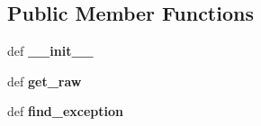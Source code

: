 \subsection*{Public Member Functions}
\begin{DoxyCompactItemize}
\item 
\hypertarget{classcheshire3_1_1document_1_1_string_document_a63fc40df6bebc5f8257cdc7d507d21c4}{def {\bfseries \-\_\-\-\_\-init\-\_\-\-\_\-}}\label{classcheshire3_1_1document_1_1_string_document_a63fc40df6bebc5f8257cdc7d507d21c4}

\item 
\hypertarget{classcheshire3_1_1document_1_1_string_document_a969220bbf5f5be2f78fb2bfd00eeda77}{def {\bfseries get\-\_\-raw}}\label{classcheshire3_1_1document_1_1_string_document_a969220bbf5f5be2f78fb2bfd00eeda77}

\item 
\hypertarget{classcheshire3_1_1document_1_1_string_document_a3959219b2b46e244b6a49915913ae498}{def {\bfseries find\-\_\-exception}}\label{classcheshire3_1_1document_1_1_string_document_a3959219b2b46e244b6a49915913ae498}

\end{DoxyCompactItemize}

